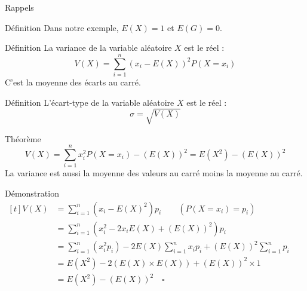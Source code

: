 \documentclass{coursbook}
\begin{document}
\begin{Gpartie}{Rappels}
\begin{Spartie}{Définition}
            Dans notre exemple, $E(X)=1$ et $E(G)=0$.
        \end{Spartie}
        \begin{Spartie}{Définition} 
            La variance de la variable aléatoire $X$ est le réel : \[V(X)=\sum_{i=1}^n\left(x_i-E(X)\right)^2P(X=x_i)\]
            C'est la moyenne des écarts au carré.
        \end{Spartie}
        \begin{Spartie}{Définition} 
            L'écart-type de la variable aléatoire $X$ est le réel : \[\sigma=\sqrt{V(X)}\]
        \end{Spartie}
        \begin{Spartie}{Théorème} 
            \[V(X)=\sum_{i=1}^nx_i^2P(X=x_i)-\left(E(X)\right)^2=E\left(X^2\right)-\left(E(X)\right)^2\]
            La variance est aussi la moyenne des valeurs au carré moins la moyenne au carré.
            \begin{SSpartie}{Démonstration} 
                $\begin{aligned}[t]
                    V(X)&=\sum_{i=1}^n\left(x_i-E(X)^2\right)p_i\qquad\left(P(X=x_i)=p_i\right) \\
                    &=\sum_{i=1}^n\left(x_i^2-2x_iE(X)+\left(E(X)\right)^2\right)p_i \\
                    &=\sum_{i=1}^n\left(x_i^2p_i\right)-2E(X)\sum_{i=1}^n x_i p_i+\left(E(X)\right)^2\sum_{i=1}^np_i \\
                    &=E\left(X^2\right)-2\left(E(X)\times E(X)\right)+\left(E(X)\right)^2\times 1 \\
                    &=E\left(X^2\right)-\left(E(X)\right)^2\quad\square
                \end{aligned}$
            \end{SSpartie}
        \end{Spartie}
    \end{Gpartie}
    \vfill
    \pagebreak
\end{document}
